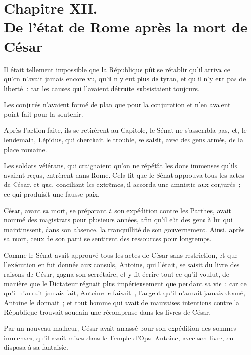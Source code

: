 \documentclass[french,twoside]{book} %
\newcommand\chapteropen{} %
\newcommand\chaptercont{} %
\begin{document}
\chapteropen
\chapter[{Chapitre XII. De l’état de Rome après la mort de César}]{Chapitre XII. \\
De l’état de Rome après la mort de César}
\label{considérations\_Romains\_chap\_12}\renewcommand{\leftmark}{Chapitre XII. \\
De l’état de Rome après la mort de César}


\chaptercont
\noindent Il était tellement impossible que la République pût se rétablir qu’il arriva ce qu’on n’avait jamais encore vu, qu’il n’y eut plus de tyran, et qu’il n’y eut pas de liberté : car les causes qui l’avaient détruite subsistaient toujours.\par
Les conjurés n’avaient formé de plan que pour la conjuration et n’en avaient point fait pour la soutenir.\par
Après l’action faite, ils se retirèrent au Capitole, le Sénat ne s’assembla pas, et, le lendemain, Lépidus, qui cherchait le trouble, se saisit, avec des gens armés, de la place romaine.\par
Les soldats vétérans, qui craignaient qu’on ne répétât les dons immenses qu’ils avaient reçus, entrèrent dans Rome. Cela fit que le Sénat approuva tous les actes de César, et que, conciliant les extrêmes, il accorda une amnistie aux conjurés ; ce qui produisit une fausse paix.\par
César, avant sa mort, se préparant à son expédition contre les Parthes, avait nommé des magistrats pour plusieurs années, afin qu’il eût des gens à lui qui maintinssent, dans son absence, la tranquillité de son gouvernement. Ainsi, après sa mort, ceux de son parti se sentirent des ressources pour longtemps.\par
Comme le Sénat avait approuvé tous les actes de César sans restriction, et que l’exécution en fut donnée aux consuls, Antoine, qui l’était, se saisit du livre des raisons de César, gagna son secrétaire, et y fit écrire tout ce qu’il voulut, de manière que le Dictateur régnait plus impérieusement que pendant sa vie : car ce qu’il n’aurait jamais fait, Antoine le faisait ; l’argent qu’il n’aurait jamais donné, Antoine le donnait ; et tout homme qui avait de mauvaises intentions contre la République trouvait soudain une récompense dans les livres de César.\par
Par un nouveau malheur, César avait amassé pour son expédition des sommes immenses, qu’il avait mises dans le Temple d’Ops. Antoine, avec son livre, en disposa à sa fantaisie.\par
\end{document}
